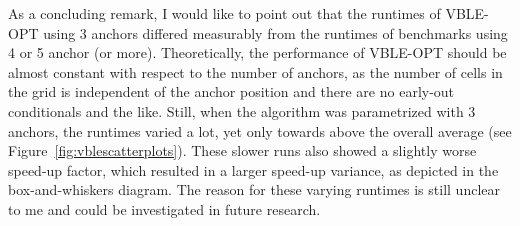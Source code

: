 As a concluding remark, I would like to point out that the runtimes of VBLE-OPT using 3 anchors differed measurably from the runtimes of benchmarks using 4 or 5 anchor (or more). Theoretically, the performance of VBLE-OPT should be almost constant with respect to the number of anchors, as the number of cells in the grid is independent of the anchor position and there are no early-out conditionals and the like. Still, when the algorithm was parametrized with 3 anchors, the runtimes varied a lot, yet only towards above the overall average (see Figure~\ref{fig:vblescatterplots}). These slower runs also showed a slightly worse speed-up factor, which resulted in a larger speed-up variance, as depicted in the box-and-whiskers diagram. The reason for these varying runtimes is still unclear to me and could be investigated in future research.
